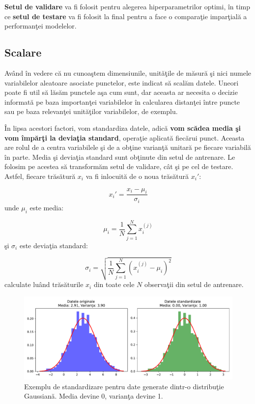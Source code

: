 \textbf{Setul de validare} va fi folosit pentru alegerea hiperparametrilor optimi, în timp ce 
\textbf{setul de testare} va fi folosit la final pentru a face o comparaţie imparţială 
a performanţei modelelor.

\subsection{Scalare}

Având în vedere că nu cunoaştem dimensiunile, unităţile de măsură şi nici 
numele variabilelor aleatoare asociate punctelor, este indicat să scalăm 
datele. Uneori poate fi util să lăsăm punctele aşa cum sunt, dar aceasta ar necesita 
o decizie informată pe baza importanţei variabilelor în calcularea 
distanţei între puncte sau pe baza 
relevanţei unităţilor variabilelor, de exemplu. 

În lipsa acestori factori, vom standardiza datele, adică  
\textbf{vom scădea media şi vom împărţi la deviaţia standard}, operaţie aplicată 
fiecărui punct. Aceasta are rolul de a centra variabilele şi de a obţine varianţă
unitară pe fiecare variabilă în parte. 
Media şi deviaţia standard sunt obţinute din setul de antrenare. Le folosim pe acestea 
să transformăm setul de validare, cât şi pe cel de testare. Astfel, fiecare trăsătură 
$x_{i}$ va fi inlocuită de o noua trăsătură $x_{i}'$:

$$x_{i}' = \frac{x_{i} - \mu_{i}}{\sigma_{i}}$$
unde $\mu_{i}$ este media: 

$$\mu_{i} = \frac{1}{N} \sum_{j=1}^{N} x_{i}^{(j)}$$
şi $\sigma_{i}$ este deviaţia standard: 

$$\sigma_{i} = \sqrt{ \frac{1}{N} \sum_{j=1}^{N} (x_{i}^{(j)} - \mu_{i}) ^ 2 }$$ 
calculate luând trăsăturile $x_{i}$ din toate cele $N$ observaţii din setul de antrenare.

\begin{figure}[H]
    \centering
    \includegraphics[width=\linewidth, keepaspectratio]{images/standardization.pdf}
    \caption{Exemplu de standardizare pentru date generate 
    dintr-o distribuţie Gaussiană. Media devine 0, varianţa devine 1.}
\end{figure}